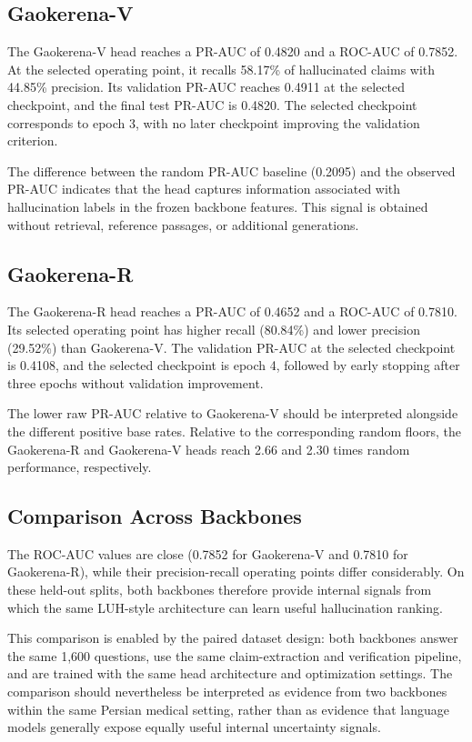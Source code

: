 \documentclass[conference]{IEEEtran}
\begin{document}
\subsection{Gaokerena-V}

The Gaokerena-V head reaches a PR-AUC of 0.4820 and a ROC-AUC of 0.7852. At the selected operating point, it recalls 58.17\% of hallucinated claims with 44.85\% precision. Its validation PR-AUC reaches 0.4911 at the selected checkpoint, and the final test PR-AUC is 0.4820. The selected checkpoint corresponds to epoch 3, with no later checkpoint improving the validation criterion.

The difference between the random PR-AUC baseline (0.2095) and the observed PR-AUC indicates that the head captures information associated with hallucination labels in the frozen backbone features. This signal is obtained without retrieval, reference passages, or additional generations.

\subsection{Gaokerena-R}

The Gaokerena-R head reaches a PR-AUC of 0.4652 and a ROC-AUC of 0.7810. Its selected operating point has higher recall (80.84\%) and lower precision (29.52\%) than Gaokerena-V. The validation PR-AUC at the selected checkpoint is 0.4108, and the selected checkpoint is epoch 4, followed by early stopping after three epochs without validation improvement.

The lower raw PR-AUC relative to Gaokerena-V should be interpreted alongside the different positive base rates. Relative to the corresponding random floors, the Gaokerena-R and Gaokerena-V heads reach 2.66 and 2.30 times random performance, respectively.

\subsection{Comparison Across Backbones}

The ROC-AUC values are close (0.7852 for Gaokerena-V and 0.7810 for Gaokerena-R), while their precision-recall operating points differ considerably. On these held-out splits, both backbones therefore provide internal signals from which the same LUH-style architecture can learn useful hallucination ranking.

This comparison is enabled by the paired dataset design: both backbones answer the same 1,600 questions, use the same claim-extraction and verification pipeline, and are trained with the same head architecture and optimization settings. The comparison should nevertheless be interpreted as evidence from two backbones within the same Persian medical setting, rather than as evidence that language models generally expose equally useful internal uncertainty signals.
\end{document}
